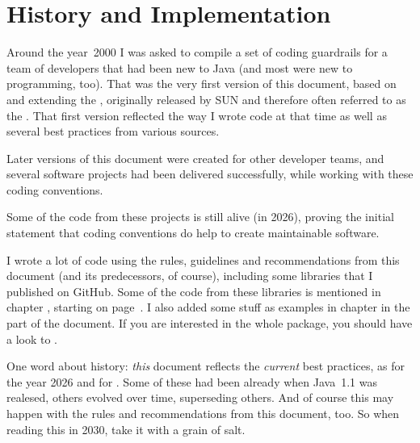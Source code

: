 \section{History and Implementation}
Around the year~2000 I was asked to compile a set of coding guardrails for a team of developers that had been new to Java (and most were new to programming, too). That was the very first version of this document, based on and extending the \ccjpl, originally released by SUN and therefore often referred to as the . That first version reflected the way I wrote \Java code at that time as well as several best practices from various sources.

Later versions of this document were created for other developer teams, and several software projects had been delivered successfully, while working with these coding conventions.

Some of the code from these projects is still alive (in 2026), proving the initial statement that coding conventions do help to create maintainable software.

I wrote a lot of code using the rules, guidelines and recommendations from this document (and its predecessors, of course), including some libraries that I published on GitHub. Some of the code from these libraries is mentioned in chapter , starting on page~\pageref{sec:CodingGuidelines}. I also added some stuff as examples in chapter  in the  part of the document. If you are interested in the whole package, you should have a look to \autocite{TQUADRAT_ORG}.

One word about history: \textit{this} document reflects the \textit{current} best practices, as for the year 2026 and for . Some of these had been  already when Java~1.1 was realesed, others evolved over time, superseding others. And of course this may happen with the rules and recommendations from this document, too. So when reading this in 2030, take it with a grain of salt.

